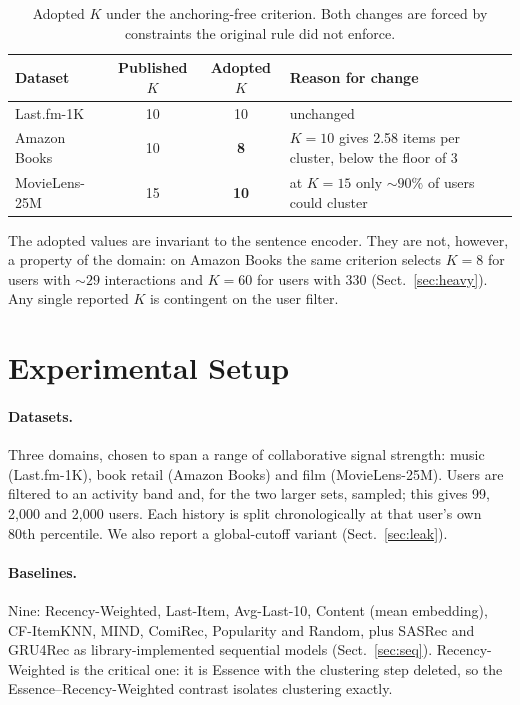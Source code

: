 \documentclass[runningheads,a4paper]{llncs}
\begin{document}
\begin{table}[tb]
\caption{Adopted $K$ under the anchoring-free criterion. Both changes are forced by
constraints the original rule did not enforce.}\label{tab:k}
\centering
\small
\begin{tabular}{@{}lccp{5.1cm}@{}}
\toprule
Dataset & Published $K$ & Adopted $K$ & Reason for change \\
\midrule
Last.fm-1K & 10 & 10 & unchanged \\
Amazon Books & 10 & \textbf{8} & $K=10$ gives 2.58 items per cluster, below the floor of 3 \\
MovieLens-25M & 15 & \textbf{10} & at $K=15$ only ${\sim}90\%$ of users could cluster \\
\bottomrule
\end{tabular}
\end{table}

The adopted values are invariant to the sentence encoder. They are not, however, a property
of the domain: on Amazon Books the same criterion selects $K=8$ for users with ${\sim}29$
interactions and $K=60$ for users with 330 (Sect.~\ref{sec:heavy}). Any single reported $K$
is contingent on the user filter.

\section{Experimental Setup}

\paragraph{Datasets.} Three domains, chosen to span a range of collaborative signal
strength: music (Last.fm-1K), book retail (Amazon Books) and film (MovieLens-25M).
Users are filtered to an activity band and, for the two larger sets, sampled; this
gives 99, 2{,}000 and 2{,}000 users. Each history is split chronologically at that
user's own 80th percentile. We also report a global-cutoff variant
(Sect.~\ref{sec:leak}).

\paragraph{Baselines.} Nine: Recency-Weighted, Last-Item, Avg-Last-10, Content
(mean embedding), CF-ItemKNN, MIND, ComiRec, Popularity and Random, plus SASRec and
GRU4Rec as library-implemented sequential models (Sect.~\ref{sec:seq}).
Recency-Weighted is the critical one: it is Essence with the clustering step deleted, so
the Essence--Recency-Weighted contrast isolates clustering exactly.
\end{document}
